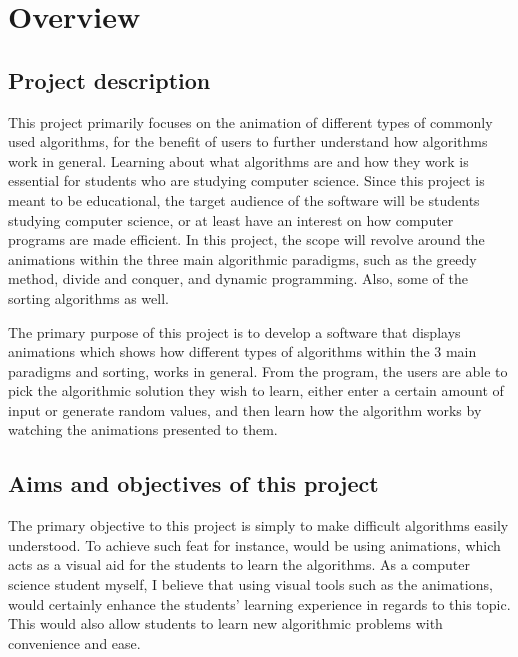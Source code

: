 \chapter{Overview}

\section{Project description}
This project primarily focuses on the animation of different types of commonly used algorithms, for the benefit of users to further understand how algorithms work in general. Learning about what algorithms are and how they work is essential for students who are studying computer science. Since this project is meant to be educational, the target audience of the software will be students studying computer science, or at least have an interest on how computer programs are made efficient. In this project, the scope will revolve around the animations within the three main algorithmic paradigms, such as the greedy method, divide and conquer, and dynamic programming. Also, some of the sorting algorithms as well.

The primary purpose of this project is to develop a software that displays animations which shows how different types of algorithms within the 3 main paradigms and sorting, works in general. From the program, the users are able to pick the algorithmic solution they wish to learn, either enter a certain amount of input or generate random values, and then learn how the algorithm works by watching the animations presented to them.

\section{Aims and objectives of this project}
The primary objective to this project is simply to make difficult algorithms easily understood. To achieve such feat for instance, would be using animations, which acts as a visual aid for the students to learn the algorithms. As a computer science student myself, I believe that using visual tools such as the animations, would certainly enhance the students' learning experience in regards to this topic. This would also allow students to learn new algorithmic problems with convenience and ease.


